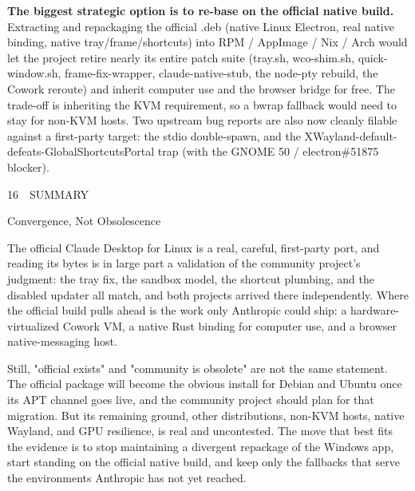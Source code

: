 \documentclass[11pt]{article}
\newcommand{\mono}{\ttfamily}
\newcommand{\reppar}[1]{{\fontsize{10.5}{15.2}\selectfont #1\par}\vspace{8pt}}
\newcommand{\code}[1]{{\mono\small #1}}
\newcommand{\reportsection}[3]{%
  \vspace{14pt}%
  {\mono\footnotesize\color{baseMid}\addfontfeatures{LetterSpace=8.0}\MakeUppercase{#1\, \textbullet\, #2}}\par
  \vspace{3pt}%
  {\heavy\fontsize{17}{19}\selectfont\color{base900} #3\par}
  \vspace{4pt}{\color{accent}\hrule height 1.6pt}\vspace{9pt}%
}
\begin{document}
\reppar{\textbf{The biggest strategic option is to re-base on the official native build.} Extracting and repackaging the official \code{.deb} (native Linux Electron, real native binding, native tray/frame/shortcuts) into RPM / AppImage / Nix / Arch would let the project retire nearly its entire patch suite (\code{tray.sh}, \code{wco-shim.sh}, \code{quick-window.sh}, \code{frame-fix-wrapper}, \code{claude-native-stub}, the node-pty rebuild, the Cowork reroute) and inherit computer use and the browser bridge for free. The trade-off is inheriting the KVM requirement, so a \code{bwrap} fallback would need to stay for non-KVM hosts. Two upstream bug reports are also now cleanly filable against a first-party target: the stdio double-spawn, and the XWayland-default-defeats-\code{GlobalShortcutsPortal} trap (with the GNOME 50 / \code{electron\#51875} blocker).}

\reportsection{16}{Summary}{Convergence, Not Obsolescence}

\reppar{The official Claude Desktop for Linux is a real, careful, first-party port, and reading its bytes is in large part a validation of the community project's judgment: the tray fix, the sandbox model, the shortcut plumbing, and the disabled updater all match, and both projects arrived there independently. Where the official build pulls ahead is the work only Anthropic could ship: a hardware-virtualized Cowork VM, a native Rust binding for computer use, and a browser native-messaging host.}

\reppar{Still, "official exists" and "community is obsolete" are not the same statement. The official package will become the obvious install for Debian and Ubuntu once its APT channel goes live, and the community project should plan for that migration. But its remaining ground, other distributions, non-KVM hosts, native Wayland, and GPU resilience, is real and uncontested. The move that best fits the evidence is to stop maintaining a divergent repackage of the Windows app, start standing on the official native build, and keep only the fallbacks that serve the environments Anthropic has not yet reached.}
\end{document}
